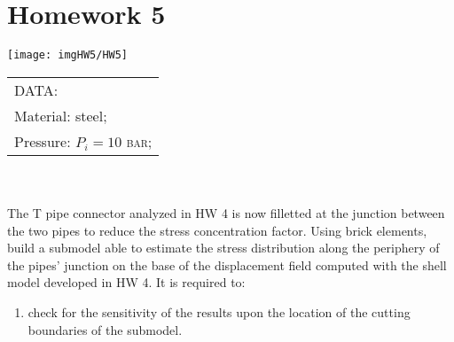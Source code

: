 \chapter{Homework 5}
\begin{minipage}{.70\textwidth}
\centering
\texttt{[image: imgHW5/HW5]}
\end{minipage}
\begin{minipage}{.70\textwidth}
\begin{tabular}{l}
        DATA:\\
        Material: steel;\\
        Pressure: $P_{i}= 10$ \textsc{bar};
\end{tabular}
\end{minipage}\\\\
The T pipe connector analyzed in HW 4 is now filletted at the junction between the two pipes to reduce the stress concentration factor. Using brick elements, build a submodel able to estimate the stress distribution along the periphery of the pipes' junction on the base of the displacement field computed with the shell model developed in HW 4. It is required to:
\begin{enumerate}
\item check for the sensitivity of the results upon the location of the cutting boundaries of the submodel.
\end{enumerate}
